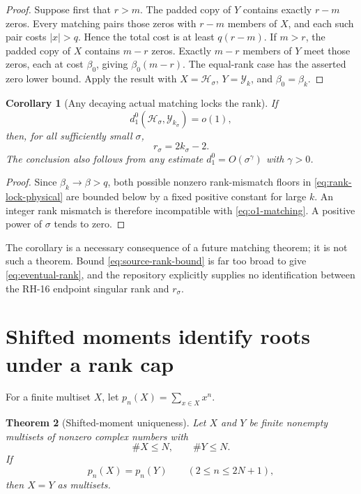 \documentclass[11pt]{article}
\newtheorem{theorem}{Theorem}[section]
\newtheorem{corollary}[theorem]{Corollary}
\theoremstyle{remark}
\newcommand{\cH}{\mathcal H}
\newcommand{\cY}{\mathcal Y}
\begin{document}
\begin{proof}
Suppose first that $r>m$.  The padded copy of $Y$ contains exactly $r-m$
zeros.  Every matching pairs those zeros with $r-m$ members of $X$, and
each such pair costs $|x|>q$.  Hence the total cost is at least $q(r-m)$.
If $m>r$, the padded copy of $X$ contains $m-r$ zeros.  Exactly $m-r$
members of $Y$ meet those zeros, each at cost $\beta_0$, giving
$\beta_0(m-r)$.  The equal-rank case has the asserted zero lower bound.
Apply the result with $X=\cH_\sigma$, $Y=\cY_k$, and
$\beta_0=\beta_k$.
\end{proof}

\begin{corollary}[Any decaying actual matching locks the rank]
\label{cor:rank-law}
If
\begin{equation}\label{eq:o1-matching}
 d_1^0(\cH_\sigma,\cY_{k_\sigma})=o(1),
\end{equation}
then, for all sufficiently small $\sigma$,
\begin{equation}\label{eq:eventual-rank}
 r_\sigma=2k_\sigma-2.
\end{equation}
The conclusion also follows from any estimate
$d_1^0=O(\sigma^\gamma)$ with $\gamma>0$.
\end{corollary}

\begin{proof}
Since $\beta_k\to\beta>q$, both possible nonzero rank-mismatch floors in
\eqref{eq:rank-lock-physical} are bounded below by a fixed positive constant
for large $k$.  An integer rank mismatch is therefore incompatible with
\eqref{eq:o1-matching}.  A positive power of $\sigma$ tends to zero.
\end{proof}

The corollary is a necessary consequence of a future matching theorem; it is
not such a theorem.  Bound \eqref{eq:source-rank-bound} is far too broad to
give \eqref{eq:eventual-rank}, and the repository explicitly supplies no
identification between the RH-16 endpoint singular rank and $r_\sigma$.

\section{Shifted moments identify roots under a rank cap}

For a finite multiset $X$, let $p_n(X)=\sum_{x\in X}x^n$.

\begin{theorem}[Shifted-moment uniqueness]
\label{thm:shifted-uniqueness}
Let $X$ and $Y$ be finite nonempty multisets of nonzero complex numbers with
\begin{equation}\label{eq:rank-cap}
 \#X\le N,\qquad \#Y\le N.
\end{equation}
If
\begin{equation}\label{eq:shifted-moments}
 p_n(X)=p_n(Y)\qquad(2\le n\le2N+1),
\end{equation}
then $X=Y$ as multisets.
\end{theorem}
\end{document}
